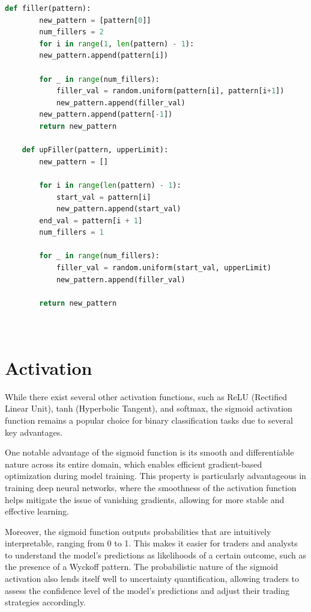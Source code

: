 \documentclass{article}
\begin{document}
\begin{lstlisting}[language=Python, caption={Creating Filler Data}]
	def filler(pattern):
		new_pattern = [pattern[0]] 
		num_fillers = 2
		for i in range(1, len(pattern) - 1):
		new_pattern.append(pattern[i])  
	
		for _ in range(num_fillers):
			filler_val = random.uniform(pattern[i], pattern[i+1])
			new_pattern.append(filler_val)
		new_pattern.append(pattern[-1])
		return new_pattern
	
	def upFiller(pattern, upperLimit):
		new_pattern = []
	
		for i in range(len(pattern) - 1):
			start_val = pattern[i]
			new_pattern.append(start_val)
		end_val = pattern[i + 1]
		num_fillers = 1
	
		for _ in range(num_fillers):
			filler_val = random.uniform(start_val, upperLimit)
			new_pattern.append(filler_val)
	
		return new_pattern
	
	

\end{lstlisting}

\section{Activation}
While there exist several other activation functions, such as ReLU (Rectified Linear Unit), tanh (Hyperbolic Tangent), and softmax, the sigmoid activation function remains a popular choice for binary classification tasks due to several key advantages.

One notable advantage of the sigmoid function is its smooth and differentiable nature across its entire domain, which enables efficient gradient-based optimization during model training. This property is particularly advantageous in training deep neural networks, where the smoothness of the activation function helps mitigate the issue of vanishing gradients, allowing for more stable and effective learning.

Moreover, the sigmoid function outputs probabilities that are intuitively interpretable, ranging from 0 to 1. This makes it easier for traders and analysts to understand the model's predictions as likelihoods of a certain outcome, such as the presence of a Wyckoff pattern. The probabilistic nature of the sigmoid activation also lends itself well to uncertainty quantification, allowing traders to assess the confidence level of the model's predictions and adjust their trading strategies accordingly.
\end{document}
